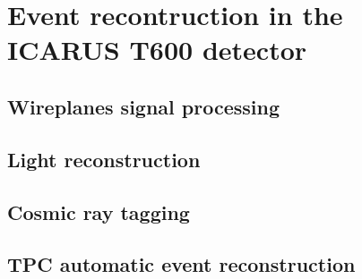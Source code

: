 
\chapter{Event recontruction in the ICARUS T600 detector}
\label{chap:event_reconstruction}



\section{Wireplanes signal processing}

\section{Light reconstruction}

\section{Cosmic ray tagging}

\section{TPC automatic event reconstruction}